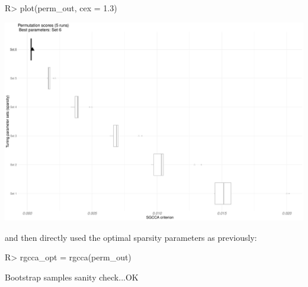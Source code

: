 \documentclass[
]{jss}
\begin{document}
\begin{CodeChunk}
\begin{CodeInput}
R> plot(perm_out, cex = 1.3)
\end{CodeInput}


\begin{center}\includegraphics{RGCCA_files/figure-latex/unnamed-chunk-46-1} \end{center}

\end{CodeChunk}

\normalsize

and then directly used the optimal sparsity parameters as previously:

\footnotesize

\begin{CodeChunk}
\begin{CodeInput}
R> rgcca_opt = rgcca(perm_out)
\end{CodeInput}
\end{CodeChunk}

\normalsize

\begin{CodeChunk}
\begin{CodeOutput}
Bootstrap samples sanity check...OK
\end{CodeOutput}
\end{CodeChunk}
\end{document}
